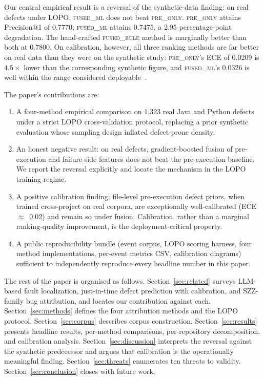 \documentclass[preprint,12pt]{elsarticle}
\begin{document}
Our central empirical result is a reversal of the synthetic-data finding: on real defects under LOPO, \textsc{fused\_ml} does not beat \textsc{pre\_only}. \textsc{pre\_only} attains Precision@1 of 0.7770; \textsc{fused\_ml} attains 0.7475, a 2.95 percentage-point degradation. The hand-crafted \textsc{fused\_rule} method is marginally better than both at 0.7800. On calibration, however, all three ranking methods are far better on real data than they were on the synthetic study: \textsc{pre\_only}'s ECE of 0.0209 is $4.5\times$ lower than the corresponding synthetic figure, and \textsc{fused\_ml}'s 0.0326 is well within the range considered deployable~\cite{guo2017calibration}.

The paper's contributions are:
\begin{enumerate}
\item A four-method empirical comparison on 1{,}323 real Java and Python defects under a strict LOPO cross-validation protocol, replacing a prior synthetic evaluation whose sampling design inflated defect-prone density.
\item An honest negative result: on real defects, gradient-boosted fusion of pre-execution and failure-side features does not beat the pre-execution baseline. We report the reversal explicitly and locate the mechanism in the LOPO training regime.
\item A positive calibration finding: file-level pre-execution defect priors, when trained cross-project on real corpora, are exceptionally well-calibrated (ECE~$\approx$~0.02) and remain so under fusion. Calibration, rather than a marginal ranking-quality improvement, is the deployment-critical property.
\item A public reproducibility bundle (event corpus, LOPO scoring harness, four method implementations, per-event metrics CSV, calibration diagrams) sufficient to independently reproduce every headline number in this paper.
\end{enumerate}

The rest of the paper is organised as follows. Section~\ref{sec:related} surveys LLM-based fault localization, just-in-time defect prediction with calibration, and SZZ-family bug attribution, and locates our contribution against each. Section~\ref{sec:methods} defines the four attribution methods and the LOPO protocol. Section~\ref{sec:corpus} describes corpus construction. Section~\ref{sec:results} presents headline results, per-method comparisons, per-repository decomposition, and calibration analysis. Section~\ref{sec:discussion} interprets the reversal against the synthetic predecessor and argues that calibration is the operationally meaningful finding. Section~\ref{sec:threats} enumerates ten threats to validity. Section~\ref{sec:conclusion} closes with future work.
\end{document}
